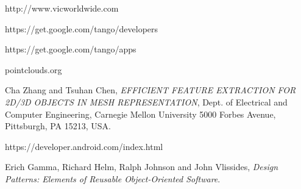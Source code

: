 

\cleardoublepage

%

\begin{thebibliography}{9}

	http://www.vicworldwide.com

	https://get.google.com/tango/developers

	https://get.google.com/tango/apps

	pointclouds.org
	
	Cha Zhang and Tsuhan Chen,
	\emph{EFFICIENT FEATURE EXTRACTION FOR 2D/3D OBJECTS IN MESH REPRESENTATION},
	Dept. of Electrical and Computer Engineering, Carnegie Mellon University 5000 Forbes Avenue, Pittsburgh, PA 15213, USA.

	https://developer.android.com/index.html


	Erich Gamma, Richard Helm, Ralph Johnson and John Vlissides,
	\emph{Design Patterns: Elements of Reusable Object-Oriented Software}.
	

\end{thebibliography}